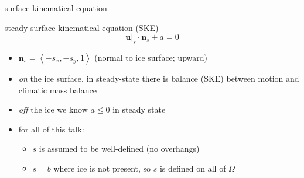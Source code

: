 \documentclass{beamer}
\newcommand{\bn}{\mathbf{n}}
\newcommand{\bu}{\mathbf{u}}
\begin{document}
\begin{frame}{surface kinematical equation}

\begin{block}{steady surface kinematical equation (SKE)}
$$\bu|_s \cdot \bn_s + a=0$$
\end{block}

\begin{itemize}
\item $\bn_s = \left<-s_x,-s_y,1\right>$  \quad (normal to ice surface; upward)
\item \emph{on} the ice surface, in steady-state there is balance (SKE) between motion and climatic mass balance
\item \emph{off} the ice we know $a\le 0$ in steady state
\item for all of this talk:
    \begin{itemize}
    \item $s$ is assumed to be well-defined (no overhangs)
    \item $s=b$ where ice is not present, so $s$ is defined on all of $\Omega$
    \end{itemize}
\end{itemize}
\end{frame}
\end{document}
